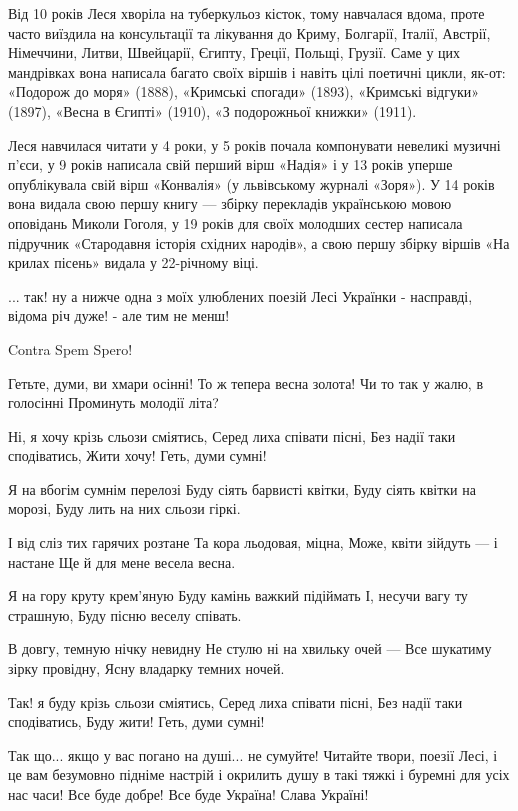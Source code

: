 Від 10 років Леся хворіла на туберкульоз кісток, тому навчалася вдома, проте часто виїздила на консультації та лікування до Криму, Болгарії, Італії, Австрії, Німеччини, Литви, Швейцарії, Єгипту, Греції, Польщі, Грузії. Саме у цих мандрівках вона написала багато своїх віршів і навіть цілі поетичні цикли, як-от: «Подорож до моря» (1888), «Кримські спогади» (1893), «Кримські відгуки» (1897), «Весна в Єгипті» (1910), «З подорожньої книжки» (1911).

Леся навчилася читати у 4 роки, у 5 років почала компонувати невеликі музичні п’єси, у 9 років написала свій перший вірш «Надія» і у 13 років уперше опублікувала свій вірш «Конвалія» (у львівському журналі «Зоря»). У 14 років вона видала свою першу книгу — збірку перекладів українською мовою оповідань Миколи Гоголя, у 19 років для своїх молодших сестер написала підручник «Стародавня історія східних народів», а свою першу збірку віршів «На крилах пісень» видала у 22-річному віці.

... так! ну а нижче одна з моїх улюблених поезій Лесі Українки - насправді, відома річ дуже! - але тим не менш! 

Contra Spem Spero!

Гетьте, думи, ви хмари осінні!
То ж тепера весна золота!
Чи то так у жалю, в голосінні
Проминуть молодії літа?

Ні, я хочу крізь сльози сміятись,
Серед лиха співати пісні,
Без надії таки сподіватись,
Жити хочу! Геть, думи сумні!

Я на вбогім сумнім перелозі
Буду сіять барвисті квітки,
Буду сіять квітки на морозі,
Буду лить на них сльози гіркі.

 І від сліз тих гарячих розтане
Та кора льодовая, міцна,
Може, квіти зійдуть — і настане
Ще й для мене весела весна.

Я на гору круту крем'яную
Буду камінь важкий підіймать
І, несучи вагу ту страшную,
Буду пісню веселу співать.

В довгу, темную нічку невидну
Не стулю ні на хвильку очей —
Все шукатиму зірку провідну,
Ясну владарку темних ночей.

Так! я буду крізь сльози сміятись,
Серед лиха співати пісні,
Без надії таки сподіватись,
Буду жити! Геть, думи сумні!

Так що... якщо у вас погано на душі... не сумуйте! Читайте твори, поезії Лесі, і це вам безумовно підніме настрій і окрилить душу в такі тяжкі і буремні для усіх нас часи! Все буде добре! Все буде Україна! Слава Україні! 💛 💙 💛 💙 💛 💙 💛 💙        


